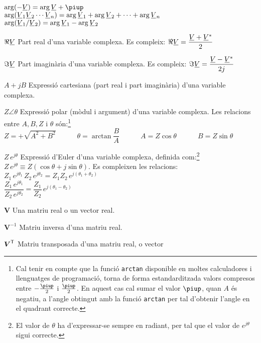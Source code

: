 \begin{list}{}
      $\arg(-\cmplx{V}) =  \arg\cmplx{V} + \piup$\\[1ex]
      $\arg(\cmplx{V}_1 \cmplx{V}_2 \cdots \cmplx{V}_n) = \arg\cmplx{V}_1 + \arg \cmplx{V}_2 + \cdots + \arg\cmplx{V}_n$\\[1ex]
      $\arg(\cmplx{V}_1 / \cmplx{V}_2) = \arg\cmplx{V}_1 - \arg \cmplx{V}_2$
    \item[$\Re\cmplx{V}$] Part real d'una variable complexa. Es compleix: $\Re\cmplx{V} = \dfrac{\cmplx{V} + \cmplx{V}^*}{2}$
    \item[$\Im\cmplx{V}$] Part imaginària d'una variable complexa. Es compleix: $\Im\cmplx{V} = \dfrac{\cmplx{V} - \cmplx{V}^*}{2 j}$
    \item[$A+j B$] Expressió cartesiana (part real i part
    imaginària) d'una variable complexa.
    \item[$Z\angle\theta$] Expressió polar (mòdul i argument) d'una variable
    complexa. Les relacions entre $A, B, Z$ i $\theta$ són:\footnote{Cal tenir en compte que la funció \texttt{arctan} disponible en moltes calculadores i llenguatges de programació, torna de forma  estandarditzada valors compresos entre $-\frac{\piup}{2}$ i $\frac{\piup}{2}$. En aquest cas cal sumar el valor $\piup$, quan $A$ és negatiu, a l'angle obtingut amb la funció \texttt{arctan} per tal d'obtenir l'angle en el quadrant correcte.}\\[1ex]
    $Z=+\sqrt{A^2+B^2}\qquad\quad\theta=\arctan{\dfrac{B}{A}}\qquad\quad
    A=Z\cos\theta\qquad\quad B=Z\sin\theta$
    \item[$Z\,e^{j\theta}$] Expressió d'Euler d'una variable complexa, definida com:\footnote{El valor de $\theta$ ha d'expressar-se sempre en radiant, per tal que el valor de $e^{j\theta}$ sigui correcte.}
     $Z\,e^{j\theta} \equiv Z(\cos\theta+j\sin\theta)$.
     Es compleixen les relacions:\\[1ex]
     $Z_1\,e^{j\theta_1} \, Z_2\,e^{j\theta_2} = Z_1 Z_2\,e^{j(\theta_1+\theta_2)}$\\[1ex]
     $\dfrac{Z_1\,e^{j\theta_1}}{Z_2\,e^{j\theta_2}} = \dfrac{Z_1}{Z_2}\,e^{j(\theta_1-\theta_2)}$
    \item[$\boldsymbol{V}$] Una matriu real o un vector real.
    \item[$\boldsymbol{V}^{-1}$] Matriu inversa d'una matriu real.
    \item[$\boldsymbol{V}^\mathrm{\textsf{T}}$] Matriu transposada d'una matriu real, o vector

\end{list}
